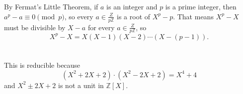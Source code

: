 \documentclass[12pt]{article}
\begin{document}
\section{}
\noindent{}\bigskip\par
By Fermat's Little Theorem, if $a$ is an integer and $p$ is a prime integer, then $a^p-a \equiv 0 \pmod{p}$, so every $a \in \frac{Z}{p\mathbb{Z}}$ is a root of $X^p-p$. That means $X^p-X$ must be divisible by $X-a$ for every $a \in \frac{Z}{p\mathbb{Z}}$, so
\[ X^p-X=X(X-1)(X-2)\cdots (X-(p-1)). \]

\section{}
\noindent{}\bigskip\par
This is reducible because
\[ (X^2+2X+2) \cdot (X^2-2X+2) = X^4+4 \]
and $X^2 \pm 2X + 2$ is not a unit in $\mathbb{Z}[X]$.
\end{document}
